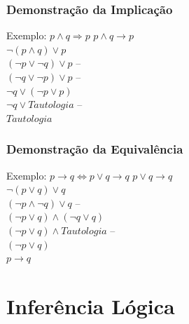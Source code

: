 \documentclass[aspectratio=169]{beamer} %
\begin{document}
\begin{frame}
\frametitle{Demonstração da Implicação}

\begin{exampleblock}{Exemplo: $p \wedge q \Rightarrow p$}
$p \wedge  q \rightarrow p$\\
$\neg (p \wedge q) \vee p$\\
$(\neg p \vee \neg q) \vee p$ -- \\
$(\neg q \vee \neg p) \vee p$ -- \\
$\neg q \vee (\neg p \vee p)$\\
$\neg q \vee Tautologia$  -- \\
$Tautologia$ \\
\end{exampleblock}
\end{frame}

\begin{frame}
\frametitle{Demonstração da Equivalência}

\begin{exampleblock}{Exemplo: $p \rightarrow q \Leftrightarrow p \vee q \rightarrow q$}
$p \vee q \rightarrow q$\\
$\neg (p \vee q) \vee q$\\
$(\neg p \wedge \neg q) \vee q$ -- \\
$(\neg p \vee q) \wedge (\neg q \vee q)$\\
$(\neg p \vee q) \wedge Tautologia$ -- \\
$(\neg p \vee q)$\\
$p \rightarrow q$
\end{exampleblock}
\end{frame}

\section{Inferência Lógica}
\end{document}
